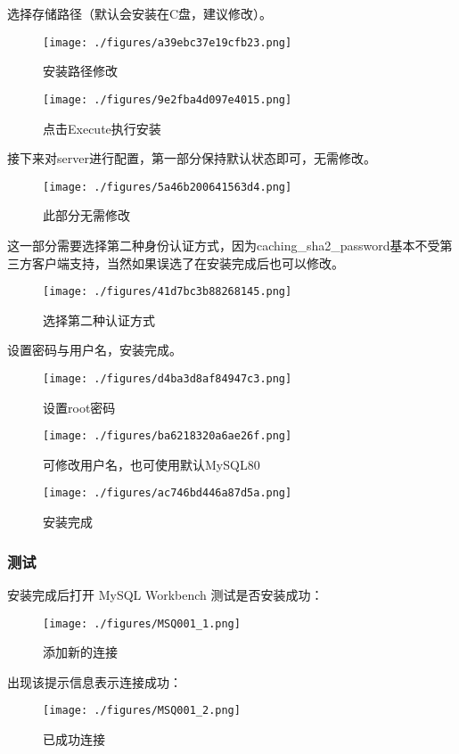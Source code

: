 选择存储路径（默认会安装在C盘，建议修改）。
\begin{figure}[ht]
\centering
\texttt{[image: ./figures/a39ebc37e19cfb23.png]}
\caption{安装路径修改} \label{fig_MSQ001_10}
\end{figure}

\begin{figure}[ht]
\centering
\texttt{[image: ./figures/9e2fba4d097e4015.png]}
\caption{点击Execute执行安装} \label{fig_MSQ001_11}
\end{figure}

接下来对server进行配置，第一部分保持默认状态即可，无需修改。
\begin{figure}[ht]
\centering
\texttt{[image: ./figures/5a46b200641563d4.png]}
\caption{此部分无需修改} \label{fig_MSQ001_12}
\end{figure}

这一部分需要选择第二种身份认证方式，因为caching_sha2_password基本不受第三方客户端支持，当然如果误选了在安装完成后也可以修改。

\begin{figure}[ht]
\centering
\texttt{[image: ./figures/41d7bc3b88268145.png]}
\caption{选择第二种认证方式} \label{fig_MSQ001_13}
\end{figure}

设置密码与用户名，安装完成。
\begin{figure}[ht]
\centering
\texttt{[image: ./figures/d4ba3d8af84947c3.png]}
\caption{设置root密码} \label{fig_MSQ001_14}
\end{figure}

\begin{figure}[ht]
\centering
\texttt{[image: ./figures/ba6218320a6ae26f.png]}
\caption{可修改用户名，也可使用默认MySQL80} \label{fig_MSQ001_15}
\end{figure}

\begin{figure}[ht]
\centering
\texttt{[image: ./figures/ac746bd446a87d5a.png]}
\caption{安装完成} \label{fig_MSQ001_16}
\end{figure}

\subsubsection{测试}
安装完成后打开 MySQL Workbench 测试是否安装成功：
\begin{figure}[ht]
\centering
\texttt{[image: ./figures/MSQ001\_1.png]}
\caption{添加新的连接} \label{fig_MSQ001_17}
\end{figure}

出现该提示信息表示连接成功：
\begin{figure}[ht]
\centering
\texttt{[image: ./figures/MSQ001\_2.png]}
\caption{已成功连接} \label{fig_MSQ001_18}
\end{figure}

